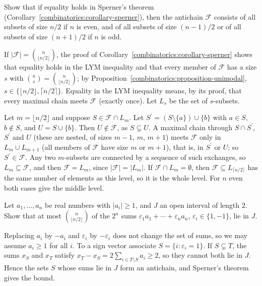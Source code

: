\begin{exercise}\label{combinatorics:exercise-sperner-equality}
Show that if equality holds in Sperner's theorem (Corollary~\ref{combinatorics:corollary-sperner}), then the antichain $\mathcal{F}$ consists of all subsets of size $n/2$ if $n$ is even, and of all
subsets of size $(n - 1)/2$ or of all subsets of size $(n + 1)/2$ if $n$ is odd.
\end{exercise}

\begin{solution}
If $|\mathcal{F}| = \binom{n}{\lfloor n/2 \rfloor}$, the proof of Corollary~\ref{combinatorics:corollary-sperner} shows that equality holds in the LYM inequality and that every member of $\mathcal{F}$ has a
size $s$ with $\binom{n}{s} = \binom{n}{\lfloor n/2 \rfloor}$; by Proposition~\ref{combinatorics:proposition-unimodal}, $s \in \{\lfloor n/2 \rfloor, \lceil n/2 \rceil\}$. Equality in the LYM inequality
means, by its proof, that every maximal chain meets $\mathcal{F}$ (exactly once). Let $L_s$ be the set of $s$-subsets.

Let $m = \lfloor n/2 \rfloor$ and suppose $S \in \mathcal{F} \cap L_m$. Let $S^{\prime} = (S \setminus \{a\}) \cup \{b\}$ with $a \in S$, $b \notin S$, and $U = S \cup \{b\}$. Then $U \notin \mathcal{F}$, as
$S \subsetneq U$. A maximal chain through $S \cap S^{\prime}$, $S^{\prime}$ and $U$ (these are nested, of sizes $m - 1$, $m$, $m + 1$) meets $\mathcal{F}$ only in $L_m \cup L_{m+1}$ (all members of
$\mathcal{F}$ have size $m$ or $m + 1$), that is, in $S^{\prime}$ or $U$; so $S^{\prime} \in \mathcal{F}$. Any two $m$-subsets are connected by a sequence of such exchanges, so $L_m \subseteq \mathcal{F}$,
and then $\mathcal{F} = L_m$, since $|\mathcal{F}| = |L_m|$. If $\mathcal{F} \cap L_m = \emptyset$, then $\mathcal{F} \subseteq L_{\lceil n/2 \rceil}$ has the same number of elements as this level, so
it is the whole level. For $n$ even both cases give the middle level.
\end{solution}

\begin{exercise}\label{combinatorics:exercise-littlewood-offord}
Let $a_1, \ldots, a_n$ be real numbers with $|a_i| \geq 1$, and $J$ an open interval of length $2$. Show that at most $\binom{n}{\lfloor n/2 \rfloor}$ of the $2^n$ sums
$\varepsilon_1a_1 + \cdots + \varepsilon_na_n$, $\varepsilon_i \in \{1, -1\}$, lie in $J$.
\end{exercise}

\begin{solution}
Replacing $a_i$ by $-a_i$ and $\varepsilon_i$ by $-\varepsilon_i$ does not change the set of sums, so we may assume $a_i \geq 1$ for all $i$. To a sign vector associate $S = \{i : \varepsilon_i = 1\}$.
If $S \subsetneq T$, the sums $x_S$ and $x_T$ satisfy $x_T - x_S = 2\sum_{i \in T \setminus S}a_i \geq 2$, so they cannot both lie in $J$. Hence the sets $S$ whose sums lie in $J$ form an antichain, and
Sperner's theorem gives the bound.
\end{solution}

